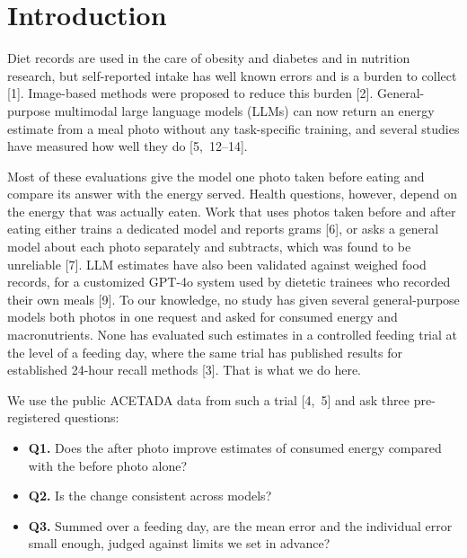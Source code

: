 \documentclass[
  11pt,
  letterpaper]{article}
\providecommand{\tightlist}{%
  \setlength{\itemsep}{0pt}\setlength{\parskip}{0pt}}
\begin{document}
\section{Introduction}\label{introduction}

Diet records are used in the care of obesity and diabetes and in nutrition research, but self-reported intake
has well known errors and is a burden to collect {[}1{]}. Image-based methods were proposed to reduce this
burden {[}2{]}. General-purpose multimodal large language models (LLMs) can now return an energy estimate from
a meal photo without any task-specific training, and several studies have measured how well they do
{[}5,~12--14{]}.

Most of these evaluations give the model one photo taken before eating and compare its answer with the energy
served. Health questions, however, depend on the energy that was actually eaten. Work that uses photos taken
before and after eating either trains a dedicated model and reports grams {[}6{]}, or asks a general model
about each photo separately and subtracts, which was found to be unreliable {[}7{]}. LLM estimates have also
been validated against weighed food records, for a customized GPT-4o system used by dietetic trainees who
recorded their own meals {[}9{]}. To our knowledge, no study has given several general-purpose models both
photos in one request and asked for consumed energy and macronutrients. None has evaluated such estimates in a
controlled feeding trial at the level of a feeding day, where the same trial has published results for
established 24-hour recall methods {[}3{]}. That is what we do here.

We use the public ACETADA data from such a trial {[}4,~5{]} and ask three pre-registered questions:

\begin{itemize}
\tightlist
\item
  \textbf{Q1.} Does the after photo improve estimates of consumed energy compared with the before photo alone?
\item
  \textbf{Q2.} Is the change consistent across models?
\item
  \textbf{Q3.} Summed over a feeding day, are the mean error and the individual error small enough, judged
  against limits we set in advance?
\end{itemize}
\end{document}
